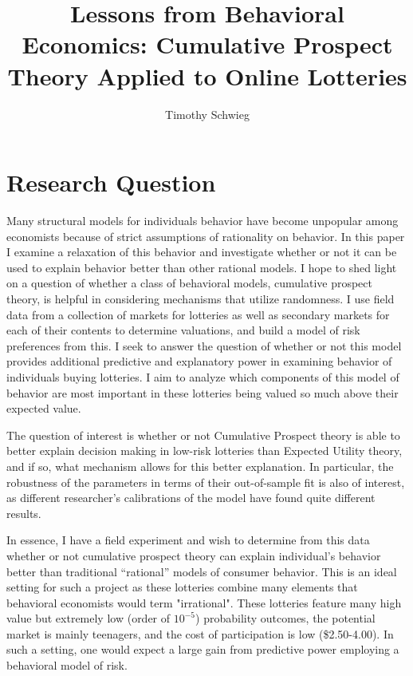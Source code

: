 \documentclass[12pt]{paper}
\title{Lessons from Behavioral Economics: Cumulative Prospect Theory
  Applied to Online Lotteries}
\author{Timothy Schwieg}
\begin{document}
\maketitle

\section{Research Question}

Many structural models for individuals behavior have become unpopular
among economists because of strict assumptions of rationality on
behavior. In this paper I examine a relaxation of this behavior and
investigate whether or not it can be used to explain behavior better
than other rational models.  I hope to shed light on a question of
whether a class of behavioral models, cumulative prospect theory, is
helpful in considering mechanisms that utilize randomness. I use field
data from a collection of markets for lotteries as well as secondary
markets for each of their contents to determine valuations, and build
a model of risk preferences from this. I seek to answer the question
of whether or not this model provides additional predictive and
explanatory power in examining behavior of individuals buying
lotteries. I aim to analyze which components of this model of behavior
are most important in these lotteries being valued so much above their
expected value.

The question of interest is whether or not Cumulative Prospect theory
is able to better explain decision making in low-risk lotteries than
Expected Utility theory, and if so, what mechanism allows for this
better explanation. In particular, the robustness of the parameters in
terms of their out-of-sample fit is also of interest, as different
researcher's calibrations of the model have found quite different
results. 

In essence, I have a field experiment and wish to determine from this
data whether or not cumulative prospect theory can explain
individual's behavior better than traditional ``rational'' models of
consumer behavior. This is an ideal setting for such a project as
these lotteries combine many elements that behavioral economists would
term "irrational". These lotteries feature many high value but
extremely low (order of $10^{-5}$) probability outcomes, the potential
market is mainly teenagers, and the cost of participation is low
(\$2.50-4.00). In such a setting, one would expect a large gain from
predictive power employing a behavioral model of risk.
\end{document}
